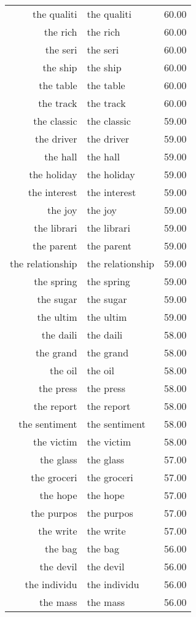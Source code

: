 \begin{table}[ht]
\begin{tabular}{rlr}
  the qualiti & the qualiti & 60.00 \\ 
  the rich & the rich & 60.00 \\ 
  the seri & the seri & 60.00 \\ 
  the ship & the ship & 60.00 \\ 
  the table & the table & 60.00 \\ 
  the track & the track & 60.00 \\ 
  the classic & the classic & 59.00 \\ 
  the driver & the driver & 59.00 \\ 
  the hall & the hall & 59.00 \\ 
  the holiday & the holiday & 59.00 \\ 
  the interest & the interest & 59.00 \\ 
  the joy & the joy & 59.00 \\ 
  the librari & the librari & 59.00 \\ 
  the parent & the parent & 59.00 \\ 
  the relationship & the relationship & 59.00 \\ 
  the spring & the spring & 59.00 \\ 
  the sugar & the sugar & 59.00 \\ 
  the ultim & the ultim & 59.00 \\ 
  the daili & the daili & 58.00 \\ 
  the grand & the grand & 58.00 \\ 
  the oil & the oil & 58.00 \\ 
  the press & the press & 58.00 \\ 
  the report & the report & 58.00 \\ 
  the sentiment & the sentiment & 58.00 \\ 
  the victim & the victim & 58.00 \\ 
  the glass & the glass & 57.00 \\ 
  the groceri & the groceri & 57.00 \\ 
  the hope & the hope & 57.00 \\ 
  the purpos & the purpos & 57.00 \\ 
  the write & the write & 57.00 \\ 
  the bag & the bag & 56.00 \\ 
  the devil & the devil & 56.00 \\ 
  the individu & the individu & 56.00 \\ 
  the mass & the mass & 56.00 \\ 

\end{tabular}
\end{table}
